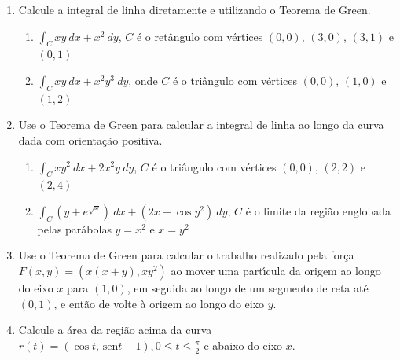 \documentclass[a4paper,5pt]{amsbook}
\newcommand{\sen}{\,\mbox{sen}}
\newcommand{\ds}{\displaystyle}
\begin{document}
\vspace{1cm}
\begin{enumerate}
    \setlength\itemsep{0.5cm}
    \item Calcule a integral de linha diretamente e utilizando o Teorema de
    Green.
        \begin{enumerate}
            \setlength\itemsep{0.3cm}
            \item $\int_C xy\ dx + x^2\ dy$, $C$ \'e o ret\^angulo com v\'ertices
            $(0,0)$, $(3,0)$, $(3,1)$ e $(0,1)$
            \item $\ds\int_C xy\ dx + x^2y^3\ dy$, onde $C$ \'e o tri\^angulo com
            v\'ertices $(0,0)$, $(1,0)$ e $(1,2)$
        \end{enumerate}

    \item Use o Teorema de Green para calcular a integral de linha ao longo da
    curva dada com orienta\c{c}\~ao positiva.
        \begin{enumerate}
            \setlength\itemsep{0.3cm}
            \item $\ds\int_C xy^2\ dx + 2x^2y\ dy$, $C$ \'e o tri\^angulo com
            v\'ertices $(0,0)$, $(2,2)$ e $(2,4)$
            \item $\ds\int_C (y+e^{\sqrt{x}})\ dx + (2x+\cos{y^2})\ dy$, $C$ \'e
            o limite da regi\~ao englobada pelas par\'abolas $y=x^2$ e $x=y^2$
        \end{enumerate}

    \item Use o Teorema de Green para calcular o trabalho realizado pela for\c{c}a
    $F(x,y)=(x(x+y), xy^2)$ ao mover uma part\'{\i}cula da origem ao longo do eixo
    $x$ para $(1,0)$, em seguida ao longo de um segmento de reta at\'e $(0,1)$, e
    ent\~ao de volte \`a origem ao longo do eixo $y$.

    \item Calcule a \'area da regi\~ao acima da curva
    $r(t)=(\cos{t},\sen{t}-1),0\le t\le \frac{\pi}{2}$ e abaixo do eixo $x$.
\end{enumerate}
\end{document}
